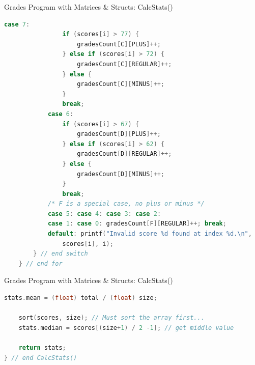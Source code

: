 \documentclass[graphics]{beamer}
\begin{document}
\begin{frame}[fragile]{Grades Program with Matrices \& Structs: CalcStats()}
    \begin{lstlisting}[language=C,basicstyle=\scriptsize,keywordstyle=\color{blue},commentstyle=\color{green},showstringspaces=false,stringstyle=\color{red}]
            case 7:
                if (scores[i] > 77) {
                    gradesCount[C][PLUS]++;
                } else if (scores[i] > 72) {
                    gradesCount[C][REGULAR]++;
                } else {
                    gradesCount[C][MINUS]++;
                }
                break;
            case 6:
                if (scores[i] > 67) {
                    gradesCount[D][PLUS]++;
                } else if (scores[i] > 62) {
                    gradesCount[D][REGULAR]++;
                } else {
                    gradesCount[D][MINUS]++;
                }
                break;
            /* F is a special case, no plus or minus */
            case 5: case 4: case 3: case 2:
            case 1: case 0: gradesCount[F][REGULAR]++; break;
            default: printf("Invalid score %d found at index %d.\n",
                scores[i], i);
        } // end switch
    } // end for
    \end{lstlisting}
\end{frame}

\begin{frame}[fragile]{Grades Program with Matrices \& Structs: CalcStats()}
    \begin{lstlisting}[language=C,basicstyle=\scriptsize,keywordstyle=\color{blue},commentstyle=\color{green},showstringspaces=false,stringstyle=\color{red}]
    stats.mean = (float) total / (float) size;
    
    sort(scores, size); // Must sort the array first...
    stats.median = scores[(size+1) / 2 -1]; // get middle value
    
    return stats;
} // end CalcStats()
    \end{lstlisting}
\end{frame}
\end{document}
